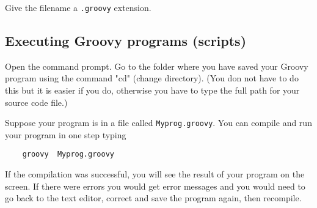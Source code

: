 Give the filename a \texttt{.groovy} extension.

\subsection*{Executing Groovy programs (scripts)}

Open the command prompt. 
Go to the folder where you have saved your Groovy
program using the command "cd" (change directory). (You don not have to
do this but it is easier if you do, otherwise you have to type the full
path for your source code file.)

Suppose your program is in a file called 
\texttt{Myprog.groovy}. You can compile and run your program in one step typing 

\begin{Verbatim}
    groovy  Myprog.groovy
\end{Verbatim}

If the compilation was successful, you will see the result of your
program on the screen.
%
If there were errors you would get error messages and you would need
to go back to the text editor, correct and save the program again,
then recompile.



